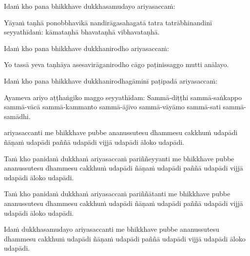 \begin{pali-hang}
Idaṁ kho pana bhikkhave dukkhasamudayo ariyasaccaṁ:
\end{pali-hang}

\begin{pali-hang}
Yāyaṁ taṇhā ponobbhavikā nandirāgasahagatā tatra tatrābhinandinī seyyathīdaṁ: kāmataṇhā bhavataṇhā vibhavataṇhā.
\end{pali-hang}

\begin{pali-hang}
Idaṁ kho pana bhikkhave dukkhanirodho ariyasaccaṁ:
\end{pali-hang}

\begin{pali-hang}
Yo tassā yeva taṇhāya asesavirāganirodho cāgo paṭinissaggo mutti anālayo.
\end{pali-hang}

\begin{pali-hang}
Idaṁ kho pana bhikkhave dukkhanirodhagāminī paṭipadā ariyasaccaṁ:
\end{pali-hang}

\begin{pali-hang}
Ayameva ariyo aṭṭhaṅgiko maggo seyyathīdam: Sammā-diṭṭhi sammā-saṅkappo sammā-vācā sammā-kammanto sammā-ājīvo sammā-vāyāmo sammā-sati sammā-samādhi.
\end{pali-hang}

\begin{pali-hang}
 ariyasaccanti me bhikkhave pubbe ananussutesu dhammesu cakkhuṁ udapādi ñāṇaṁ udapādi paññā udapādi vijjā udapādi āloko udapādi.
\end{pali-hang}

\begin{pali-hang}
Taṁ kho panidaṁ dukkhaṁ ariyasaccaṁ pariññeyyanti me bhikkhave pubbe ananussutesu dhammesu cakkhuṁ udapādi ñāṇaṁ udapādi paññā udapādi vijjā udapādi āloko udapādi.
\end{pali-hang}

\begin{pali-hang}
Taṁ kho panidaṁ dukkhaṁ ariyasaccaṁ pariññātanti me bhikkhave pubbe ananussutesu dhammesu cakkhuṁ udapādi ñāṇaṁ udapādi paññā udapādi vijjā udapādi āloko udapādi.
\end{pali-hang}

\begin{pali-hang}
Idaṁ dukkhasamudayo ariyasaccanti me bhikkhave pubbe ananussutesu dhammesu cakkhuṁ udapādi ñāṇaṁ udapādi paññā udapādi vijjā udapādi āloko udapādi.
\end{pali-hang}

